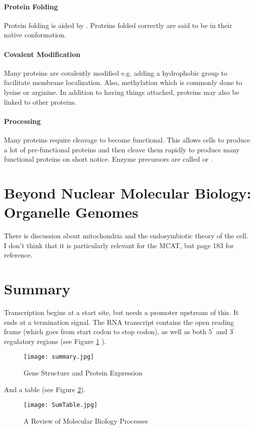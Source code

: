 \documentclass[../Bio_chemistryReview.tex]{subfiles}
\begin{document}
\paragraph{Protein Folding}
Protein folding is aided by . Proteins folded correctly are
said to be in their native conformation. 

\paragraph{Covalent Modification}
Many proteins are covalently modified e.g. adding a hydrophobic group to
facilitate membrane localization. Also, methylation which is commonly done to
lysine or arginine. In addition to having things attached, proteins may also be
linked to other proteins.

\paragraph{Processing}
Many proteins require cleavage to become functional. This allows cells to
produce a lot of pre-functional proteins and then cleave them rapidly to produce
many functional proteins on short notice. Enzyme precursors are called
 or .

\section*{Beyond Nuclear Molecular Biology: Organelle Genomes}
There is discussion about mitochondria and the endosymbiotic theory of the cell.
I don't think that it is particularly relevant for the MCAT, but page 183 for
reference.

\section{Summary}
Transcription begins at a start site, but needs a promoter upstream of this. It
ends at a termination signal. The RNA transcript contains the open reading frame
(which goes from start codon to stop codon), as well as both $ 5^{\prime} $ and
$ 3^{\prime} $ regulatory regions (see Figure \ref{fig:GeneSummary} ).
\begin{figure}[H]
  \centering
  \texttt{[image: summary.jpg]}
  \caption{Gene Structure and Protein Expression}
  \label{fig:GeneSummary}
\end{figure}
And a table (see Figure \ref{fig:RevTable}).
\begin{figure}[H]
  \centering
  \texttt{[image: SumTable.jpg]}
  \caption{A Review of Molecular Biology Processes}
  \label{fig:RevTable}
\end{figure}
\end{document}
